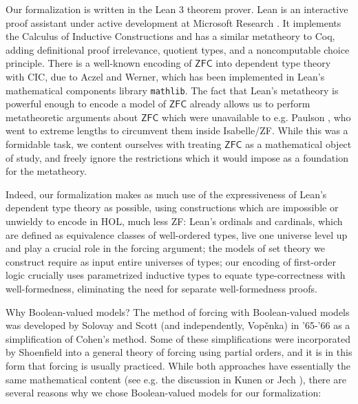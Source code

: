 \documentclass[a4paper,USenglish,cleveref, autoref]{lipics-v2019}
\newcommand{\lil}{\lstinline}
\begin{document}
Our formalization is written in the Lean 3 theorem prover. Lean is an interactive proof assistant under active development at Microsoft Research \cite{de2015lean} \cite{sebastian-slides}. It implements the Calculus of Inductive Constructions and has a similar metatheory to Coq, adding definitional proof irrelevance, quotient types, and a noncomputable choice principle. There is a well-known encoding of $\mathsf{ZFC}$ into dependent type theory with CIC, due to Aczel and Werner, which has been implemented in Lean's mathematical components library \lil{mathlib}. The fact that Lean's metatheory is powerful enough to encode a model of $\mathsf{ZFC}$ already allows us to perform metatheoretic arguments about $\mathsf{ZFC}$ which were unavailable to e.g. Paulson \cite{paulson2003relative}, who went to extreme lengths to circumvent them inside Isabelle/ZF. While this was a formidable task, we content ourselves with treating $\mathsf{ZFC}$ as a mathematical object of study, and freely ignore the restrictions which it would impose as a foundation for the metatheory.

Indeed, our formalization makes as much use of the expressiveness of Lean's dependent type theory as possible, using constructions which are impossible or unwieldy to encode in HOL, much less ZF: Lean's ordinals and cardinals, which are defined as equivalence classes of well-ordered types, live one universe level up and play a crucial role in the forcing argument; the models of set theory we construct require as input entire universes of types; our encoding of first-order logic crucially uses parametrized inductive types to equate type-correctness with well-formedness, eliminating the need for separate well-formedness proofs.

Why Boolean-valued models? The method of forcing with Boolean-valued models was developed by Solovay and Scott (and independently, Vop{\v e}nka) in '65-'66 \cite{scott1} \cite{vopenka1} as a simplification of Cohen's method. Some of these simplifications were incorporated by Shoenfield \cite{solovay1} into a general theory of forcing using partial orders, and it is in this form that forcing is usually practiced. While both approaches have essentially the same mathematical content (see e.g. the discussion in Kunen \cite{kunen1} or Jech \cite{jech1}), there are several reasons why we chose Boolean-valued models for our formalization:
\end{document}
